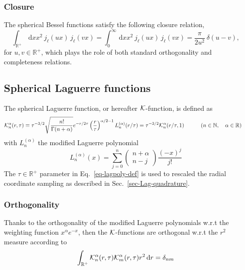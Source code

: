 \documentclass[a4paper,11pt]{article}
\newcommand{\realsnn}{\ensuremath{{\mathbb{R}^{+}}}}
\newcommand{\dx}{\ensuremath{\mathrm{\,d}}}
\begin{document}
\subsubsection{Closure}

The spherical Bessel functions satisfy the following closure relation,
\begin{equation}
  \int_{\realsnn} \dx x x^2 \: j_\ell(ux) \: j_\ell(vx) 
  =
  \int_0^\infty \dx x x^2 \: j_\ell(ux) \: j_\ell(vx) 
  =
  \frac{\pi}{2u^2} \: 
  \delta(u-v)
  ,
\end{equation}
for $u,v \in \realsnn$, which plays the role of both standard orthogonality and completeness relations.


\subsection{Spherical Laguerre functions}
The spherical Laguerre function, or hereafter ${\cal K}$-function, is defined as
\begin{align}
{\cal K}^\alpha_n(r, \tau) &\equiv \tau^{-3/2} \sqrt{\frac{n!}{\Gamma(n+\alpha)}} e^{-r/2\tau} \left( \frac{r}{\tau}\right)^{\alpha/2 -1} L_n^{(\alpha)}(r/\tau)= \tau^{-3/2}{\cal K}^\alpha_n(r/\tau,1) \quad \quad\quad  (n\in \mathbb{N}, \quad \alpha \in \mathbb{R})
\label{eq-sphLag-def}
\end{align}
 with $L_n^{(\alpha)}$ the modified Laguerre polynomial 
 \begin{equation}
L^{(\alpha)}_n(x)  = \sum_{j=0}^n \left( \begin{array}{c} n + \alpha \\ n - j \end{array}\right) \frac{(-x)^j}{j!}
\label{eq-lagpoly-def}
\end{equation}
The $\tau  \in \realsnn$ parameter in Eq.~\ref{eq-lagpoly-def} is used to rescaled the radial coordinate sampling as described in Sec.~\ref{sec-Lag-quadrature}.
\subsubsection{Orthogonality}
Thanks to the orthogonality of the modified Laguerre polynomials w.r.t the weighting function $x^\alpha e^{-x}$, then the  ${\cal K}$-functions are orthogonal w.r.t the $r^2$ measure according to 
\begin{equation}
\int_\realsnn {\cal K}^\alpha_n(r, \tau) {\cal K}^\alpha_m(r, \tau) r^2 \dx r = \delta_{nm}
\label{eq-sphLag-orto}
\end{equation}
\end{document}
